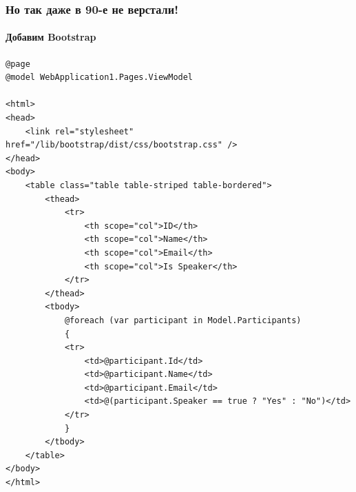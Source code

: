 \documentclass[xetex,mathserif,serif]{beamer}
\begin{document}
	\begin{frame}[fragile]
		\frametitle{Но так даже в 90-е не верстали!}
		\framesubtitle{Добавим Bootstrap}
		\begin{tiny}
			\begin{verbatim}
@page
@model WebApplication1.Pages.ViewModel

<html>
<head>
    <link rel="stylesheet" href="/lib/bootstrap/dist/css/bootstrap.css" />
</head>
<body>
    <table class="table table-striped table-bordered">
        <thead>
            <tr>
                <th scope="col">ID</th>
                <th scope="col">Name</th>
                <th scope="col">Email</th>
                <th scope="col">Is Speaker</th>
            </tr>
        </thead>
        <tbody>
            @foreach (var participant in Model.Participants)
            {
            <tr>
                <td>@participant.Id</td>
                <td>@participant.Name</td>
                <td>@participant.Email</td>
                <td>@(participant.Speaker == true ? "Yes" : "No")</td>
            </tr>
            }
        </tbody>
    </table>
</body>
</html>
			\end{verbatim}
		\end{tiny}
	\end{frame}
\end{document}
